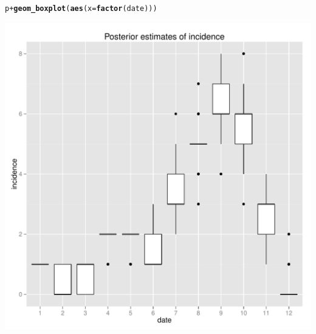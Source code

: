 \documentclass{article}\usepackage[]{graphicx}\usepackage[]{color}
\makeatletter
\newcommand{\hlopt}[1]{\textcolor[rgb]{0,0,0}{#1}}%
\newcommand{\hlstd}[1]{\textcolor[rgb]{0.345,0.345,0.345}{#1}}%
\newcommand{\hlkwc}[1]{\textcolor[rgb]{0.333,0.667,0.333}{#1}}%
\newcommand{\hlkwd}[1]{\textcolor[rgb]{0.737,0.353,0.396}{\textbf{#1}}}%
\newenvironment{kframe}{%
 \def\at@end@of@kframe{}%
 \ifinner\ifhmode%
  \def\at@end@of@kframe{\end{minipage}}%
  \begin{minipage}{\columnwidth}%
 \fi\fi%
 \def\FrameCommand##1{\hskip\@totalleftmargin \hskip-\fboxsep
 \colorbox{shadecolor}{##1}\hskip-\fboxsep
     \hskip-\linewidth \hskip-\@totalleftmargin \hskip\columnwidth}%
 \MakeFramed {\advance\hsize-\width
   \@totalleftmargin\z@ \linewidth\hsize
   \@setminipage}}%
 {\par\unskip\endMakeFramed%
 \at@end@of@kframe}
\newenvironment{knitrout}{}{} %
\makeatother
\begin{document}
\begin{knitrout}
\color{fgcolor}\begin{kframe}
\begin{alltt}
\hlstd{p} \hlopt{+} \hlkwd{geom_boxplot}\hlstd{(}\hlkwd{aes}\hlstd{(}\hlkwc{x}\hlstd{=}\hlkwd{factor}\hlstd{(date)))}
\end{alltt}
\end{kframe}

{\centering \includegraphics[width=.6\textwidth]{figs/unnamed-chunk-49} 

}



\end{knitrout}
\end{document}
